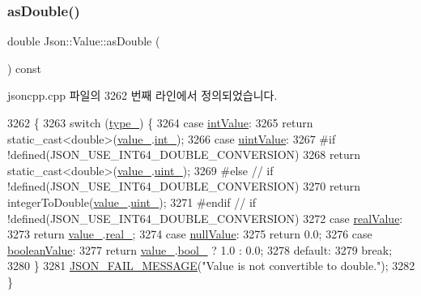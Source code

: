 \subsubsection{\texorpdfstring{as\+Double()}{asDouble()}}
{\footnotesize\ttfamily double Json\+::\+Value\+::as\+Double (\begin{DoxyParamCaption}{ }\end{DoxyParamCaption}) const}



jsoncpp.\+cpp 파일의 3262 번째 라인에서 정의되었습니다.


\begin{DoxyCode}
3262                              \{
3263   \textcolor{keywordflow}{switch} (\hyperlink{class_json_1_1_value_abd222c2536dc88bf330dedcd076d2356}{type\_}) \{
3264   \textcolor{keywordflow}{case} \hyperlink{namespace_json_a7d654b75c16a57007925868e38212b4eae5a9d708d5c9e23ae9bf98898522512d}{intValue}:
3265     \textcolor{keywordflow}{return} \textcolor{keyword}{static\_cast<}\textcolor{keywordtype}{double}\textcolor{keyword}{>}(\hyperlink{class_json_1_1_value_aef578244546212705b9f81eb84d7e151}{value\_}.\hyperlink{union_json_1_1_value_1_1_value_holder_adbfb384301298844ed955ba5cf6015a0}{int\_});
3266   \textcolor{keywordflow}{case} \hyperlink{namespace_json_a7d654b75c16a57007925868e38212b4eaea788d9a3bb00adc6d68d97d43e1ccd3}{uintValue}:
3267 \textcolor{preprocessor}{#if !defined(JSON\_USE\_INT64\_DOUBLE\_CONVERSION)}
3268     \textcolor{keywordflow}{return} \textcolor{keyword}{static\_cast<}\textcolor{keywordtype}{double}\textcolor{keyword}{>}(\hyperlink{class_json_1_1_value_aef578244546212705b9f81eb84d7e151}{value\_}.\hyperlink{union_json_1_1_value_1_1_value_holder_aab65665dc15a24a29a8e93cdeeaa7e50}{uint\_});
3269 \textcolor{preprocessor}{#else  // if !defined(JSON\_USE\_INT64\_DOUBLE\_CONVERSION)}
3270     \textcolor{keywordflow}{return} integerToDouble(\hyperlink{class_json_1_1_value_aef578244546212705b9f81eb84d7e151}{value\_}.\hyperlink{union_json_1_1_value_1_1_value_holder_aab65665dc15a24a29a8e93cdeeaa7e50}{uint\_});
3271 \textcolor{preprocessor}{#endif // if !defined(JSON\_USE\_INT64\_DOUBLE\_CONVERSION)}
3272   \textcolor{keywordflow}{case} \hyperlink{namespace_json_a7d654b75c16a57007925868e38212b4eab837c7b869c14d8be712deb45c9e490e}{realValue}:
3273     \textcolor{keywordflow}{return} \hyperlink{class_json_1_1_value_aef578244546212705b9f81eb84d7e151}{value\_}.\hyperlink{union_json_1_1_value_1_1_value_holder_af0c5ca724e5fe3a15db773d750e2351e}{real\_};
3274   \textcolor{keywordflow}{case} \hyperlink{namespace_json_a7d654b75c16a57007925868e38212b4ea7d9899633b4409bd3fc107e6737f8391}{nullValue}:
3275     \textcolor{keywordflow}{return} 0.0;
3276   \textcolor{keywordflow}{case} \hyperlink{namespace_json_a7d654b75c16a57007925868e38212b4ea14c30dbf4da86f7b809be299f671f7fd}{booleanValue}:
3277     \textcolor{keywordflow}{return} \hyperlink{class_json_1_1_value_aef578244546212705b9f81eb84d7e151}{value\_}.\hyperlink{union_json_1_1_value_1_1_value_holder_a92edab1861dadbfefd8be5fd4285eefe}{bool\_} ? 1.0 : 0.0;
3278   \textcolor{keywordflow}{default}:
3279     \textcolor{keywordflow}{break};
3280   \}
3281   \hyperlink{json_8h_a67007439f94bc6afc465923f56147ba1}{JSON\_FAIL\_MESSAGE}(\textcolor{stringliteral}{"Value is not convertible to double."});
3282 \}
\end{DoxyCode}
